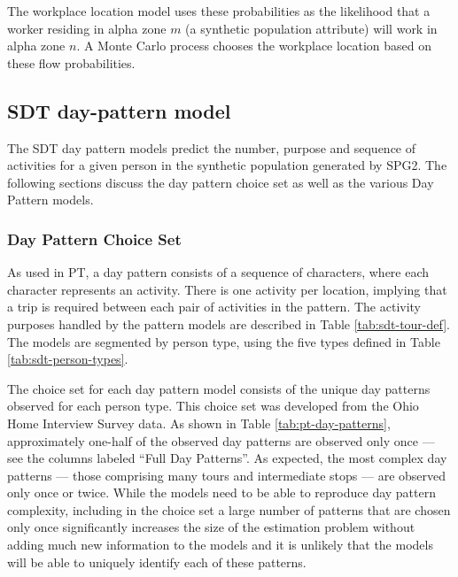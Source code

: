 The workplace location model uses these probabilities as the likelihood that a worker residing in alpha zone $m$ (a synthetic population attribute) will work in alpha zone $n$. A Monte Carlo process chooses the workplace location based on these flow probabilities.

\subsection{SDT day-pattern model}\label{sec:sdt-day-pattern}
The SDT day pattern models predict the number, purpose and sequence of activities for a given person in the synthetic population generated by SPG2. The following sections discuss the day pattern choice set as well as the various Day Pattern models.

\subsubsection{Day Pattern Choice Set}
As used in PT, a day pattern consists of a sequence of characters, where each character represents an activity. There is one activity per location, implying that a trip is required between each pair of activities in the pattern. The activity purposes handled by the pattern models are described in Table \ref{tab:sdt-tour-def}. The models are segmented by person type, using the five types defined in Table \ref{tab:sdt-person-types}. 

The choice set for each day pattern model consists of the unique day patterns observed for each person type. This choice set was developed from the Ohio Home Interview Survey data. As shown in Table \ref{tab:pt-day-patterns}, approximately one-half of the observed day patterns are observed only once --- see the columns labeled ``Full Day Patterns''. As expected, the most complex day patterns --- those comprising many tours and intermediate stops --- are observed only once or twice. While the models need to be able to reproduce day pattern complexity, including in the choice set a large number of patterns that are chosen only once significantly increases the size of the estimation problem without adding much new information to the models and it is unlikely that the models will be able to uniquely identify each of these patterns. 

